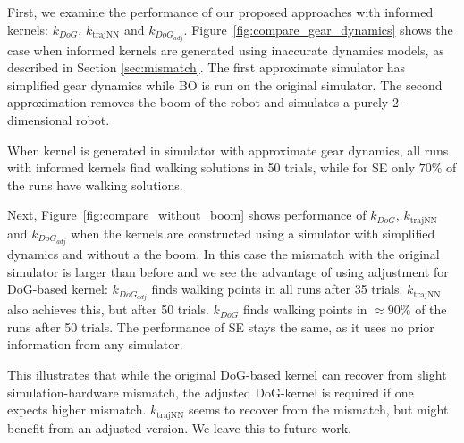 First, we examine the performance of our proposed approaches with informed kernels: $k_{DoG}$, $k_{\text{trajNN}}$ and $k_{DoG_{adj}}$. Figure~\ref{fig:compare_gear_dynamics} shows the case when informed kernels are generated using inaccurate dynamics models, as described in Section \ref{sec:mismatch}. The first approximate simulator has simplified gear dynamics while BO is run on the original simulator. The second approximation removes the boom of the robot and simulates a purely 2-dimensional robot.

When kernel is generated in simulator with approximate gear dynamics, all runs with informed kernels find walking solutions in 50 trials, while for SE only $70\%$ of the runs have walking solutions.

Next, Figure~\ref{fig:compare_without_boom} shows performance of $k_{DoG}$, $k_{\text{trajNN}}$ and $k_{DoG_{adj}}$ when the kernels are constructed using a simulator with simplified dynamics and without a the boom. In this case the mismatch with the original simulator is larger than before and we see the advantage of using adjustment for DoG-based kernel: $k_{DoG_{adj}}$ finds walking points in all runs after 35 trials. $k_{\text{trajNN}}$ also achieves this, but after 50 trials. $k_{DoG}$ finds walking points in $\approx\!90\%$ of the runs after 50 trials. The performance of SE stays the same, as it uses no prior information from any simulator.

This illustrates that while the original DoG-based kernel can recover from slight simulation-hardware mismatch, the adjusted DoG-kernel is required if one expects higher mismatch.  $k_{\text{trajNN}}$ seems to recover from the mismatch, but might benefit from an adjusted version. We leave this to future work.


